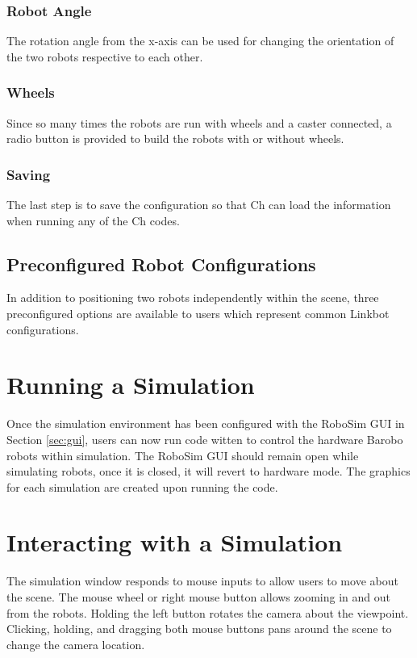 \documentclass{article}
\begin{document}
\subsubsection{Robot Angle}
The rotation angle from the x-axis can be used for changing the orientation of
the two robots respective to each other. 

\subsubsection{Wheels}
Since so many times the robots are run with wheels and a caster connected, a
radio button is provided to build the robots with or without wheels.

\subsubsection{Saving}
The last step is to save the configuration so that Ch can load the information
when running any of the Ch codes.

\subsection{Preconfigured Robot Configurations}
In addition to positioning two robots independently within the scene, three
preconfigured options are available to users which represent common Linkbot
configurations.

\section{Running a Simulation}
Once the simulation environment has been configured with the RoboSim GUI in
Section \ref{sec:gui}, users can now run code witten to control the hardware
Barobo robots within simulation.  The RoboSim GUI should remain open while
simulating robots, once it is closed, it will revert to hardware mode.  The
graphics for each simulation are created upon running the code.

\section{Interacting with a Simulation}
The simulation window responds to mouse inputs to allow users to move about the
scene.  The mouse wheel or right mouse button allows zooming in and out from the
robots.  Holding the left button rotates the camera about the viewpoint.
Clicking, holding, and dragging both mouse buttons pans around the scene to
change the camera location.
\end{document}

